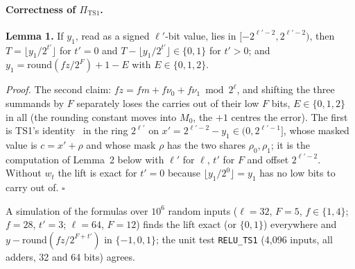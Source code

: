 \paragraph{Correctness of $\Pi_{\mathrm{TS1}}$.} \textbf{Lemma 1.} If $y_1$, read as a signed $\ell'$-bit value, lies in
$[-2^{\ell'-2}, 2^{\ell'-2})$, then $T = \lfloor y_1 / 2^{t'} \rfloor$ for $t' = 0$ and
$T - \lfloor y_1 / 2^{t'} \rfloor \in \{0, 1\}$ for $t' > 0$; and $y_1 = \mathrm{round}(f z / 2^F) + 1 - E$ with
$E \in \{0, 1, 2\}$.

\emph{Proof.} The second claim: $f z = f m + f \nu_0 + f \nu_1 \bmod 2^\ell$, and shifting the three summands by $F$
separately loses the carries out of their low $F$ bits, $E \in \{0, 1, 2\}$ in all (the rounding constant moves
into $M_0$, the $+1$ centres the error). The first is TS1's identity~\cite[Fig.~9]{tu} in the ring $2^{\ell'}$ on
$x' = 2^{\ell'-2} - y_1 \in (0, 2^{\ell'-1}]$, whose masked value is $c = x' + \rho$ and whose mask $\rho$ has the
two shares $\rho_0, \rho_1$; it is the computation of Lemma~2 below with $\ell'$ for $\ell$, $t'$ for $F$ and offset
$2^{\ell'-2}$. Without $w_t$ the lift is exact for $t' = 0$ because $\lfloor y_1 / 2^0 \rfloor = y_1$ has no low bits
to carry out of. \hfill$\square$

A simulation of the formulas over $10^6$ random inputs ($\ell = 32$, $F = 5$, $f \in \{1, 4\}$; $f = 28$, $t' = 3$;
$\ell = 64$, $F = 12$) finds the lift exact (or $\{0, 1\}$) everywhere and $y - \mathrm{round}(f z / 2^{F+t'})$ in
$\{-1, 0, 1\}$; the unit test \texttt{RELU\_TS1} (4,096 inputs, all adders, 32 and 64 bits) agrees.

